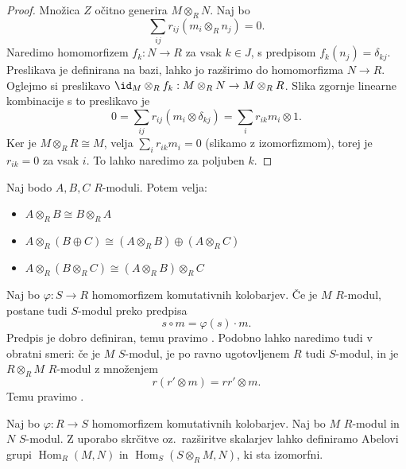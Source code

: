 \begin{proof}
  Množica $Z$ očitno generira $M \otimes_R N$.
  Naj bo
  \[
	\sum_{ij} r_{ij} (m_i \otimes_R n_j) = 0.
  \]
  Naredimo homomorfizem $f_k: N \to R$ za vsak $k \in J$, s predpisom $f_k(n_j)
  = \delta_{kj}$.
  Preslikava je definirana na bazi, lahko jo razširimo do homomorfizma $N \to
  R$.
  Oglejmo si preslikavo $\id_M \otimes_R f_k : M \otimes_R N \to M \otimes_R R$.
  Slika zgornje linearne kombinacije s to preslikavo je
  \[
	0 = \sum_{ij} r_{ij} (m_i \otimes \delta_{kj}) = \sum_i r_{ik} m_i \otimes 1.
  \]
  Ker je $M \otimes_R R \cong M$, velja $\sum_i r_{ik} m_i = 0$ (slikamo z
  izomorfizmom), torej je $r_{ik} = 0$ za vsak $i$.
  To lahko naredimo za poljuben $k$.
\end{proof}


\begin{trditev}
  Naj bodo $A, B, C$ $R$-moduli.
  Potem velja:
  \begin{itemize}
  \item $A \otimes_R B \cong B \otimes_R A$
  \item $A \otimes_R (B \oplus C) \cong (A \otimes_R B) \oplus (A \otimes_R C)$
  \item $A \otimes_R (B \otimes_R C) \cong (A \otimes_R B) \otimes_R C$
  \end{itemize}
\end{trditev}


Naj bo $\varphi : S \to R$ homomorfizem komutativnih kolobarjev.
Če je $M$ $R$-modul, postane tudi $S$-modul preko predpisa
\[
  s \circ m = \varphi(s) \cdot m.
\]
Predpis je dobro definiran, temu pravimo .
Podobno lahko naredimo tudi v obratni smeri:
če je $M$ $S$-modul, je po ravno ugotovljenem $R$ tudi $S$-modul, in je $R
\otimes_R M$ $R$-modul z množenjem
\[
  r(r' \otimes m) = rr' \otimes m.
\]
Temu pravimo .


\begin{trditev}
  Naj bo $\varphi: R \to S$ homomorfizem komutativnih kolobarjev.
  Naj bo $M$ $R$-modul in $N$ $S$-modul.
  Z uporabo skrčitve oz.~razširitve skalarjev lahko definiramo Abelovi grupi
  $\operatorname{Hom}_R(M,N)$ in $\operatorname{Hom}_S(S \otimes_R M, N)$, ki
  sta izomorfni.
\end{trditev}


